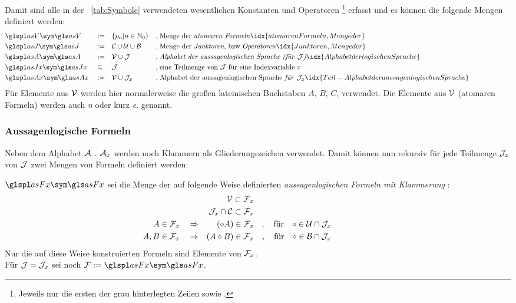 Damit sind alle in der \tablename~\vref{tab:Symbole} verwendeten wesentlichen Konstanten und Operatoren%
\footnote{%
	Jeweils nur die ersten der grau hinterlegten Zeilen sowie \symqt{$\lmult$}.%
}
erfasst und es können die folgende Mengen definiert werden:
\begin{align}
%
& \glsSym{asV}  & & \defeq    & & \{ p_n | n \in \gsNo \}
& ,\; & \text{Menge der \emph{atomaren Formeln}}
\idx{atomaren Formeln, Menge der}         \label{def:V}  \\
%
& \glsSym{asJ}  & & \defeq    & &\asC \cup \asU \cup \asB
& ,\; & \text{Menge der \emph{Junktoren}, \textbzw \emph{Operatoren}}
\idx{Junktoren, Menge der}                \label{def:J}  \\
%
& \glsSym{asA}  & & \defeq    & & \asV \cup \asJ
& ,\; & \text{\emph{Alphabet der aussagenlogischen Sprache (für }} \asJ
\text{\emph{)}}
\idx{Alphabet der logischen Sprache}      \label{def:A}  \\
%
& \glsSym{asJx} & & \subseteq & & \asJ
& ,\; & \text{eine Teilmenge von } \asJ \text{ für eine Indexvariable }
x                                         \label{def:Bx} \\
%
& \glsSym{asAx} & & \defeq    & & \asV \cup \asJx \quad
& ,\; & \text{Alphabet der aussagenlogischen Sprache \emph{für} } \asJx
\idx{Teil-Alphabet der aussagenlogischen Sprache} \label{def:Ax}
\formulatoleft
%
\end{align}
Für Elemente aus $\mathcal{V}$ werden hier normalerweise die großen lateinischen Buchstaben $A$, $B$, $C$, \textbzw verwendet.
Die Elemente aus $\mathcal{V}$ (atomaren Formeln) werden auch \emph{}\emph{n} oder kurz \emph{}\emph{e}. genannt.

\subsubsection{Aussagenlogische Formeln}%
\label{subsub:Formeln}

Neben dem Alphabet $\mathcal{A}$ \textbzw. $\mathcal{A}_x$ werden noch Klammern als Gliederungszeichen verwendet.
Damit können nun rekursiv für jede Teilmenge $\mathcal{J}_x$ von $\mathcal{J}$ zwei Mengen von Formeln definiert werden:

$\glsSym{asFx}$ sei die Menge der auf folgende Weise definierten \emph{aussagenlogischen Formeln mit Klammerung}%
:
\begin{align}
&                & \mathcal{V}            \subset \mathcal{F}_x
\\
&                & \mathcal{J}_x \cap \mathcal{C} \subset \mathcal{F}_x
\\
A                                \in \mathcal{F}_x
& \quad \Rightarrow &  (\circ A)    \in \mathcal{F}_x
& & , \quad \text{für} \quad \circ \in \mathcal{U} \cap \mathcal{J}_x
\\
A, B                             \in \mathcal{F}_x
& \quad \Rightarrow & (A \circ B)   \in \mathcal{F}_x
& & , \quad \text{für} \quad \circ \in \mathcal{B} \cap \mathcal{J}_x
&&&&&&&&&&
\end{align}
Nur die auf diese Weise konstruierten Formeln sind Elemente von $\mathcal{F}_x$.
\\Für $\mathcal{J} = \mathcal{J}_x$ sei noch $\asF \defeq \glsSym{asFx}$.

